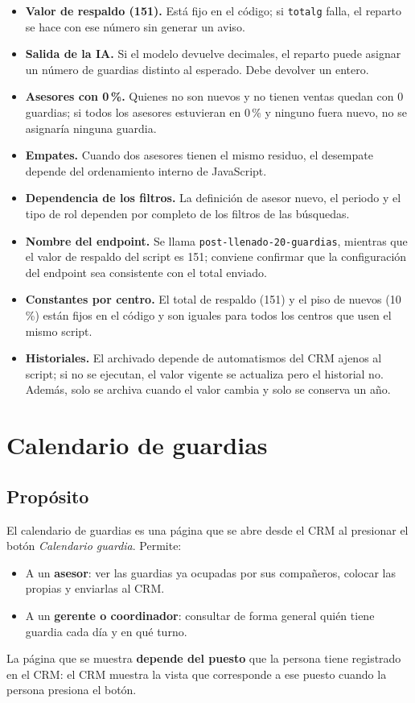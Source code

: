 \documentclass[11pt,a4paper]{article}
\newcommand{\code}[1]{\texttt{#1}}
\begin{document}
\begin{itemize}
  \item \textbf{Valor de respaldo (151).} Está fijo en el código; si \code{totalg} falla, el reparto se hace con ese número sin generar un aviso.
  \item \textbf{Salida de la IA.} Si el modelo devuelve decimales, el reparto puede asignar un número de guardias distinto al esperado. Debe devolver un entero.
  \item \textbf{Asesores con 0\,\%.} Quienes no son nuevos y no tienen ventas quedan con 0 guardias; si todos los asesores estuvieran en 0\,\% y ninguno fuera nuevo, no se asignaría ninguna guardia.
  \item \textbf{Empates.} Cuando dos asesores tienen el mismo residuo, el desempate depende del ordenamiento interno de JavaScript.
  \item \textbf{Dependencia de los filtros.} La definición de asesor nuevo, el periodo y el tipo de rol dependen por completo de los filtros de las búsquedas.
  \item \textbf{Nombre del endpoint.} Se llama \code{post-llenado-20-guardias}, mientras que el valor de respaldo del script es 151; conviene confirmar que la configuración del endpoint sea consistente con el total enviado.
  \item \textbf{Constantes por centro.} El total de respaldo (151) y el piso de nuevos (10\,\%) están fijos en el código y son iguales para todos los centros que usen el mismo script.
  \item \textbf{Historiales.} El archivado depende de automatismos del CRM ajenos al script; si no se ejecutan, el valor vigente se actualiza pero el historial no. Además, solo se archiva cuando el valor cambia y solo se conserva un año.
\end{itemize}

\section{Calendario de guardias}
\label{sec:calendario}

\subsection{Propósito}
El calendario de guardias es una página que se abre desde el CRM al presionar el botón \emph{Calendario guardia}. Permite:
\begin{itemize}[nosep]
  \item A un \textbf{asesor}: ver las guardias ya ocupadas por sus compañeros, colocar las propias y enviarlas al CRM.
  \item A un \textbf{gerente o coordinador}: consultar de forma general quién tiene guardia cada día y en qué turno.
\end{itemize}
La página que se muestra \textbf{depende del puesto} que la persona tiene registrado en el CRM: el CRM muestra la vista que corresponde a ese puesto cuando la persona presiona el botón.
\end{document}
